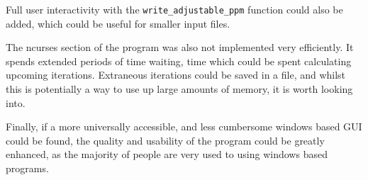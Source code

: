 	Full user interactivity with the \texttt{write\_adjustable\_ppm} function could also be added, which could be useful for smaller input files.

	The ncurses section of the program was also not implemented very efficiently.
	It spends extended periods of time waiting, time which could be spent calculating upcoming iterations.
	Extraneous iterations could be saved in a file, and whilst this is potentially a way to use up large amounts of memory, it is worth looking into.
	
	Finally, if a more universally accessible, and less cumbersome windows based GUI could be found, the quality and usability of the program could be greatly enhanced, as the majority of people are very used to using windows based programs.

